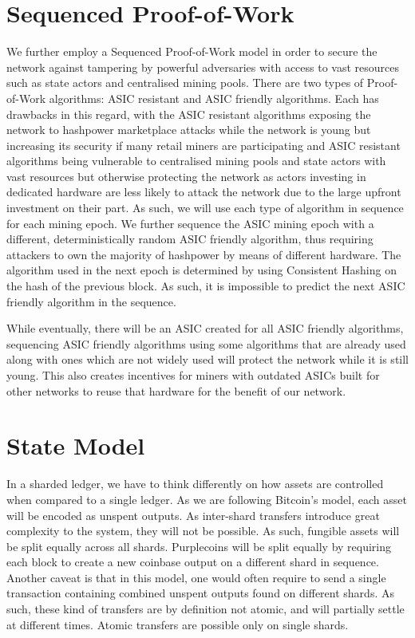 \documentclass[notitlepage]{article}
\begin{document}
\section{Sequenced Proof-of-Work}
We further employ a Sequenced Proof-of-Work model in order to secure the network against tampering by powerful adversaries with access to vast resources such as state actors and centralised mining pools. There are two types of Proof-of-Work algorithms: ASIC resistant and ASIC friendly algorithms. Each has drawbacks in this regard, with the ASIC resistant algorithms exposing the network to hashpower marketplace attacks while the network is young but increasing its security if many retail miners are participating and ASIC resistant algorithms being vulnerable to centralised mining pools and state actors with vast resources but otherwise protecting the network as actors investing in dedicated hardware are less likely to attack the network due to the large upfront investment on their part. As such, we will use each type of algorithm in sequence for each mining epoch. We further sequence the ASIC mining epoch with a different, deterministically random ASIC friendly algorithm, thus requiring attackers to own the majority of hashpower by means of different hardware. The algorithm used in the next epoch is determined by using Consistent Hashing on the hash of the previous block. As such, it is impossible to predict the next ASIC friendly algorithm in the sequence.

While eventually, there will be an ASIC created for all ASIC friendly algorithms, sequencing ASIC friendly algorithms using some algorithms that are already used along with ones which are not widely used will protect the network while it is still young. This also creates incentives for miners with outdated ASICs built for other networks to reuse that hardware for the benefit of our network.

\section{State Model}
In a sharded ledger, we have to think differently on how assets are controlled when compared to a single ledger. As we are following Bitcoin's model, each asset will be encoded as unspent outputs. As inter-shard transfers introduce great complexity to the system, they will not be possible. As such, fungible assets will be split equally across all shards. Purplecoins will be split equally by requiring each block to create a new coinbase output on a different shard in sequence. Another caveat is that in this model, one would often require to send a single transaction containing combined unspent outputs found on different shards. As such, these kind of transfers are by definition not atomic, and will partially settle at different times. Atomic transfers are possible only on single shards. 
\end{document}
